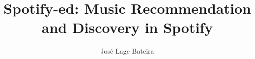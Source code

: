 \documentclass[11pt,a4paper,twoside,openright]{report}
\begin{document}
\title{Spotify-ed: Music Recommendation and Discovery in Spotify}
\author{José Lage Bateira}





\begin{Prolog}
  \cleardoublepage
  \tableofcontents
  \cleardoublepage
  \listoffigures
  \cleardoublepage
\end{Prolog}

\StartBody

 







\renewcommand{\bibname}{References}





% 

\end{document}
